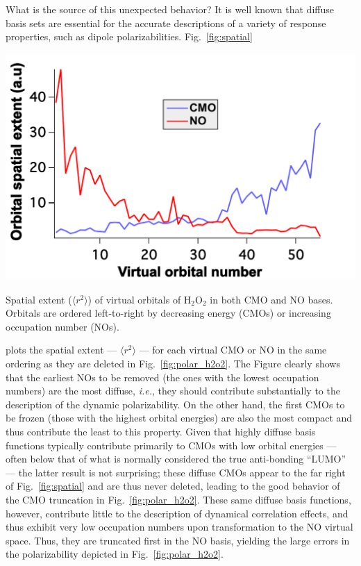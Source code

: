 What is the source of this unexpected behavior?  It is well known that diffuse
basis sets are essential for the accurate descriptions of a variety of
response properties, such as dipole polarizabilities.\cite{Woon94}  Fig.~\ref{fig:spatial}
\begin{MyFigure}[h!]
\centering
\includegraphics[width=0.6\linewidth,natwidth=610,natheight=642]{figures_fvno/spatial.pdf}
\caption{{\footnotesize Spatial extent ($\langle r^2\rangle$) of virtual
orbitals of H$_2$O$_2$ in both CMO and NO bases.  Orbitals are ordered
left-to-right by decreasing energy (CMOs) or increasing occupation number (NOs).}}
\label{fig:spatial}
\end{MyFigure}
plots the spatial extent --- $\langle r^2 \rangle$ --- for each virtual CMO or
NO in the same ordering as they are deleted in Fig.~\ref{fig:polar_h2o2}.  The
Figure clearly shows that the earliest NOs to be removed (the ones with the
lowest occupation numbers) are the most diffuse, {\em i.e.}, they should
contribute substantially to the description of the dynamic polarizability.  On
the other hand, the first CMOs to be frozen (those with the highest orbital
energies) are also the most compact and thus contribute the least to this
property.  Given that highly diffuse basis functions typically contribute
primarily to CMOs with low orbital energies --- often below that of what is
normally considered the true anti-bonding ``LUMO'' --- the latter result is
not surprising; these diffuse CMOs appear to the far right of
Fig.~\ref{fig:spatial} and are thus never deleted, leading to the good
behavior of the CMO truncation in Fig.~\ref{fig:polar_h2o2}.  These same
diffuse basis functions, however, contribute little to the description of
dynamical correlation effects, and thus exhibit very low occupation numbers
upon transformation to the NO virtual space.  Thus, they are truncated first
in the NO basis, yielding the large errors in the polarizability depicted in
Fig.~\ref{fig:polar_h2o2}.

